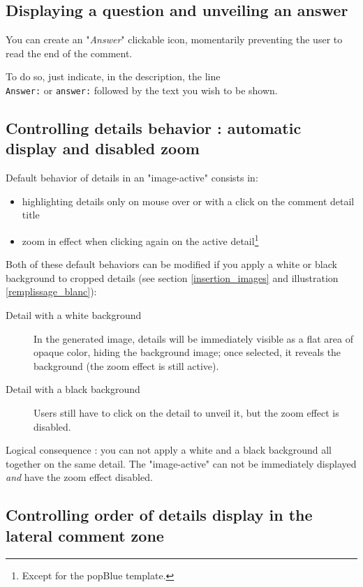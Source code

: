 \subsection{Displaying a question and unveiling an answer}

You can create an "\textit{Answer}" clickable icon, momentarily 
preventing the user to read the end of the comment.

To do so, just indicate, in the description, the line\\ \verb|Answer:| or 
\verb|answer:| followed by the text you wish to be shown.

\subsection{Controlling details behavior : automatic display and disabled zoom}\label{white_black_background}
\label{couche_XML}

Default behavior of details in an "image-active" consists in:
\begin{itemize}
 \item highlighting details only on mouse over or with a click on the comment 
 detail title
 \item zoom in effect when clicking again on the active detail\footnote{Except 
 for the popBlue template.}
\end{itemize}

Both of these default behaviors can be modified if you apply a white
 or black background to cropped details (see section 
\ref{insertion_images} 
 and illustration 
\ref{remplissage_blanc}):
\begin{description}
 \item [Detail with a white background] In the generated image, details will be
 immediately visible as a flat area of opaque color, hiding the background image;  
 once selected, it reveals the background (the zoom effect is still active).
 \item [Detail with a black background] Users still have to click on the detail to unveil it, but the zoom effect is disabled.
\end{description}

Logical consequence : you can not apply a white and a black
background all together on the same detail. The "image-active" can not be 
 immediately displayed \textit{and} have the zoom effect disabled.

\subsection{Controlling order of details display in the lateral comment zone}

